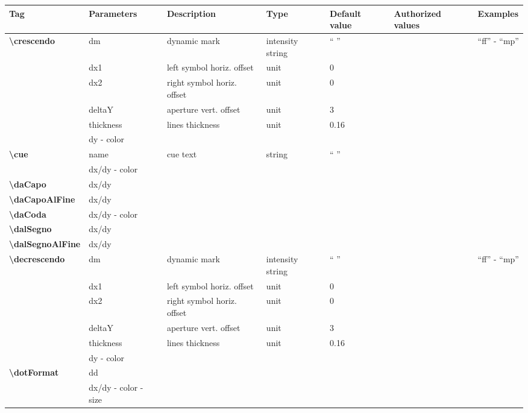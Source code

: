 \documentclass[a4paper, landscape, 10pt]{article}
\begin{document}
\begin{tabularx}{\linewidth}{p{3cm}p{3cm}p{5cm}p{3cm}p{2.5cm}p{3.5cm}p{4cm}}
    \hline
    \textbf{Tag}&\textbf{Parameters}&\textbf{Description}&\textbf{Type}&\textbf{Default value}&\textbf{Authorized values}&\textbf{Examples}\\
    \hline
    \textbf{\textbackslash{}crescendo}&dm&dynamic mark&intensity string&`` ''&&``ff'' - ``mp''\\
    &dx1&left symbol horiz. offset&unit&0&&\\
    &dx2&right symbol horiz. offset&unit&0&&\\
    &deltaY&aperture vert. offset&unit&3&&\\
    &thickness&lines thickness&unit&0.16&&\\
	&dy - color&&&&&\\
    \hline
    \textbf{\textbackslash{}cue}&name&cue text&string&`` ''&&\\
    &dx/dy - color&&&&&\\
    \hline
    \textbf{\textbackslash{}daCapo}&dx/dy&&&&&\\
    \hline
    \textbf{\textbackslash{}daCapoAlFine}&dx/dy&&&&&\\
    \hline
    \textbf{\textbackslash{}daCoda}&dx/dy - color&&&&&\\
    \hline
    \textbf{\textbackslash{}dalSegno}&dx/dy&&&&&\\
    \hline
    \textbf{\textbackslash{}dalSegnoAlFine}&dx/dy&&&&&\\
    \hline
    \textbf{\textbackslash{}decrescendo}&dm&dynamic mark&intensity string&`` ''&&``ff'' - ``mp''\\
    &dx1&left symbol horiz. offset&unit&0&&\\
    &dx2&right symbol horiz. offset&unit&0&&\\
    &deltaY&aperture vert. offset&unit&3&&\\
    &thickness&lines thickness&unit&0.16&&\\
    &dy - color&&&&&\\
    \hline    
    \textbf{\textbackslash{}dotFormat}&dd&&&&&\\ %
    &dx/dy - color - size&&&&&\\

\end{tabularx}
\end{document}
